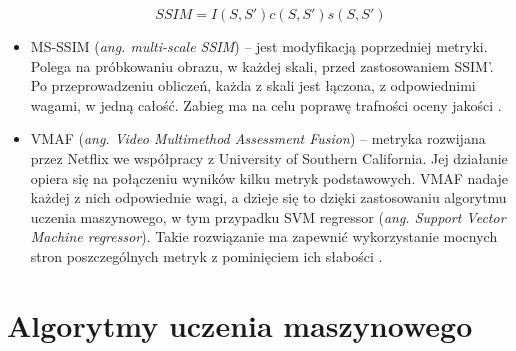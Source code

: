 \begin{itemize}[label=$\bullet$]
\begin{equation}
\label{eqn:ssim}
SSIM = I(S, S')c(S, S')s(S,S')
\end{equation}
\item MS-SSIM ({\em ang. multi-scale SSIM}) -- jest modyfikacją poprzedniej metryki. Polega na próbkowaniu obrazu, w każdej skali, przed zastosowaniem SSIM'. Po przeprowadzeniu obliczeń, każda z skali jest łączona, z odpowiednimi wagami, w jedną całość. Zabieg ma na celu poprawę trafności oceny jakości \cite{ssim_2}. 
\item VMAF ({\em ang. Video Multimethod Assessment Fusion}) -- metryka rozwijana przez Netflix we współpracy z University of Southern California. Jej działanie opiera się na połączeniu wyników kilku metryk podstawowych. VMAF nadaje każdej z nich odpowiednie wagi, a dzieje się to dzięki zastosowaniu algorytmu uczenia maszynowego, w tym przypadku SVM regressor ({\em ang. Support Vector Machine regressor}). Takie rozwiązanie ma zapewnić wykorzystanie mocnych stron poszczególnych metryk z pominięciem ich słabości \cite{netflix}. 
\end{itemize}

\section{Algorytmy uczenia maszynowego }




